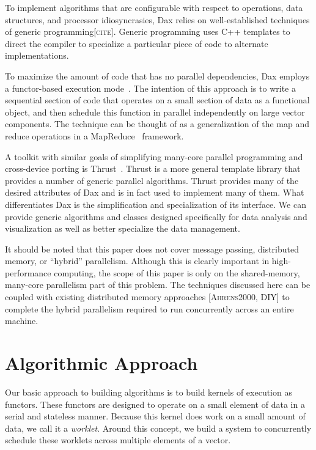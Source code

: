 \documentclass{sig-alternate}
\newcommand*{\lcite}[1]{~\cite{#1}}
\newcommand*{\keyterm}[1]{\emph{#1}}
\newcommand{\fix}[1]{{\color{red}\textsc{[#1]}}}
\begin{document}
\noindent
To implement algorithms that are configurable with respect to operations,
data structures, and processor idiosyncrasies, Dax relies on
well-established techniques of generic programming\fix{cite}.  Generic
programming uses C++ templates to direct the compiler to specialize a
particular piece of code to alternate implementations.

To maximize the amount of code that has no parallel dependencies, Dax
employs a functor-based execution mode\lcite{Baker2010}.  The intention of
this approach is to write a sequential section of code that operates on a
small section of data as a functional object, and then schedule this
function in parallel independently on large vector components.  The
technique can be thought of as a generalization of the map and reduce
operations in a MapReduce\lcite{MapReduce} framework.

A toolkit with similar goals of simplifying many-core parallel programming
and cross-device porting is Thrust\lcite{Thrust}.  Thrust is a more general
template library that provides a number of generic parallel algorithms.
Thrust provides many of the desired attributes of Dax and is in fact used
to implement many of them.  What differentiates Dax is the simplification
and specialization of its interface.  We can provide generic algorithms and
classes designed specifically for data analysis and visualization as well
as better specialize the data management.

It should be noted that this paper does not cover message passing,
distributed memory, or ``hybrid'' parallelism.  Although this is clearly
important in high-performance computing, the scope of this paper is only on
the shared-memory, many-core parallelism part of this problem.  The
techniques discussed here can be coupled with existing distributed memory
approaches \fix{Ahrens2000, DIY} to complete the hybrid parallelism
required to run concurrently across an entire machine.

\section{Algorithmic Approach}
\label{sec:AlgorithmicApproach}

\noindent
Our basic approach to building algorithms is to build kernels of execution
as functors.  These functors are designed to operate on a small element of
data in a serial and stateless manner.  Because this kernel does work on a
small amount of data, we call it a \keyterm{worklet}.  Around this concept,
we build a system to concurrently schedule these worklets across multiple
elements of a vector.
\end{document}
